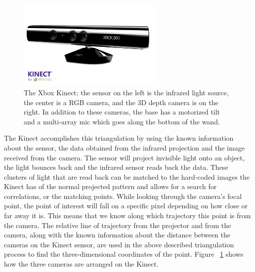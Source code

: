 \documentclass[12pt,twocolumn]{article}
\begin{document}
\begin{figure}[H]
\centering
\includegraphics[width=70mm]{kinect.jpg}
\caption{The Xbox Kinect; the sensor on the left is the infrared light source, the center is a RGB camera, and the 3D depth camera is on the right. In addition to these cameras, the base has a motorized tilt and a multi-array mic which goes along the bottom of the wand.}
\label{kinectlable}
\end{figure}
\indent  The Kinect accomplishes this triangulation by using the known information about the sensor, the data obtained from the infrared projection and the image received from the camera. The sensor will project invisible light onto an object, the light bounces back and the infrared sensor reads back the data. These clusters of light that are read back can be matched to the hard-coded images the Kinect has of the normal projected pattern and allows for a search for correlations, or the matching points. While looking through the camera's focal point, the point of interest will fall on a specific pixel depending on how close or far away it is. This means that we know along which trajectory this point is from the camera. The relative line of trajectory from the projector and from the camera, along with the known information about the distance between the cameras on the Kinect sensor, are used in the above described triangulation process to find the three-dimensional coordinates of the point. Figure ~\ref{kinectlable} shows how the three cameras are arranged on the Kinect.
\end{document}
